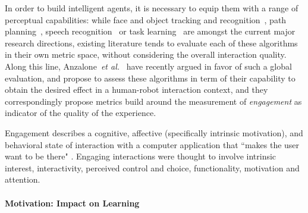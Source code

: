 \documentclass{sig-alternate}
\newcommand{\etal}{\textit{et al.}\xspace}
\begin{document}
%

In order to build intelligent agents, it is necessary to equip them with a range
of perceptual capabilities: while face and object tracking and
recognition~\cite{Zhao:2003, Jafri:2014}, path planning~\cite{Galceran:2013},
speech recognition~\cite{brick2007incremental} or task
learning~\cite{calinon2007learning} are amongst the current major research
directions, existing literature tends to evaluate each of these algorithms in
their own metric space, without considering the overall interaction quality.
Along this line, Anzalone~\etal~\cite{anzalone} have recently argued in favor of
such a global evaluation, and propose to assess these algorithms in term of
their capability to obtain the desired effect in a human-robot interaction
context, and they correspondingly propose metrics build around the measurement
of \emph{engagement} as indicator of the quality of the experience.

Engagement describes a cognitive, affective (specifically intrinsic motivation),
and behavioral state of interaction with a computer application that ``makes the
user want to be there" \cite{OBrien:2010}. Engaging interactions were thought to
involve intrinsic interest, interactivity, perceived control and choice,
functionality, motivation and attention.

\paragraph{Motivation: Impact on Learning}
\end{document}

